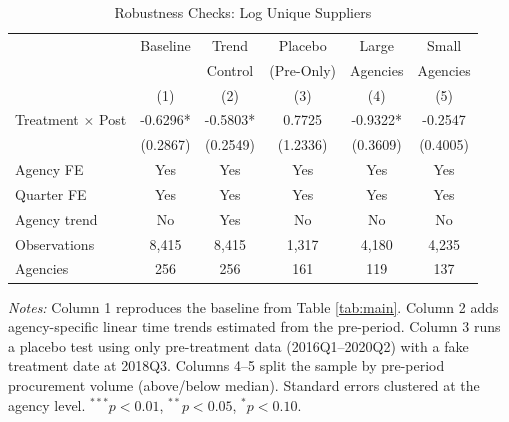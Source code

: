 \begin{table}[t]
\centering
\caption{Robustness Checks: Log Unique Suppliers}
\label{tab:robust}
\begin{tabular}{lccccc}
\hline\hline
 & Baseline & Trend & Placebo & Large & Small \\
 & & Control & (Pre-Only) & Agencies & Agencies \\
 & (1) & (2) & (3) & (4) & (5) \\
\hline
Treatment $\times$ Post & -0.6296* & -0.5803* & 0.7725 & -0.9322* & -0.2547 \\
 & (0.2867) & (0.2549) & (1.2336) & (0.3609) & (0.4005) \\
\hline
Agency FE & Yes & Yes & Yes & Yes & Yes \\
Quarter FE & Yes & Yes & Yes & Yes & Yes \\
Agency trend & No & Yes & No & No & No \\
Observations & 8,415 & 8,415 & 1,317 & 4,180 & 4,235 \\
Agencies & 256 & 256 & 161 & 119 & 137 \\
\hline\hline
\end{tabular}
\begin{tablenotes}
\item \textit{Notes:} Column 1 reproduces the baseline from Table \ref{tab:main}. Column 2 adds agency-specific linear time trends estimated from the pre-period. Column 3 runs a placebo test using only pre-treatment data (2016Q1--2020Q2) with a fake treatment date at 2018Q3. Columns 4--5 split the sample by pre-period procurement volume (above/below median). Standard errors clustered at the agency level. $^{***}p<0.01$, $^{**}p<0.05$, $^{*}p<0.10$.
\end{tablenotes}
\end{table}

